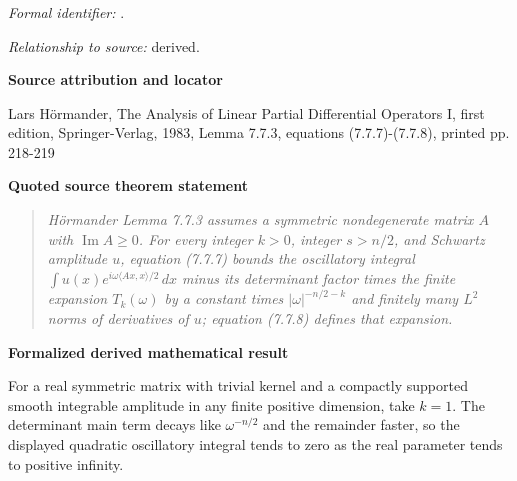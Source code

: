 \documentclass[10pt,oneside]{article}
\newenvironment{sourcequote}{\begin{quote}\itshape}{\end{quote}}
\newcommand{\reviewlabel}[1]{\par\smallskip\noindent\textsf{\bfseries #1}\par\smallskip}
\begin{document}
\subsubsection{\texttt{}}
\noindent\textit{Formal identifier:} \texttt{}.\par
\noindent\textit{Relationship to source:} derived.

\reviewlabel{Source attribution and locator}
Lars Hörmander, The Analysis of Linear Partial Differential Operators I, first edition, Springer-Verlag, 1983, Lemma 7.7.3, equations (7.7.7)-(7.7.8), printed pp. 218-219

\reviewlabel{Quoted source theorem statement}
\begin{sourcequote}
H\"ormander Lemma 7.7.3 assumes a symmetric nondegenerate matrix $A$ with $\operatorname{Im}A\geq0$. For every integer $k>0$, integer $s>n/2$, and Schwartz amplitude $u$, equation (7.7.7) bounds the oscillatory integral $\int u(x)e^{i\omega\langle Ax,x\rangle/2}\,dx$ minus its determinant factor times the finite expansion $T_k(\omega)$ by a constant times $|\omega|^{-n/2-k}$ and finitely many $L^2$ norms of derivatives of $u$; equation (7.7.8) defines that expansion.
\end{sourcequote}

\reviewlabel{Formalized derived mathematical result}
For a real symmetric matrix with trivial kernel and a compactly supported smooth integrable amplitude in any finite positive dimension, take $k=1$. The determinant main term decays like $\omega^{-n/2}$ and the remainder faster, so the displayed quadratic oscillatory integral tends to zero as the real parameter tends to positive infinity.
\end{document}
